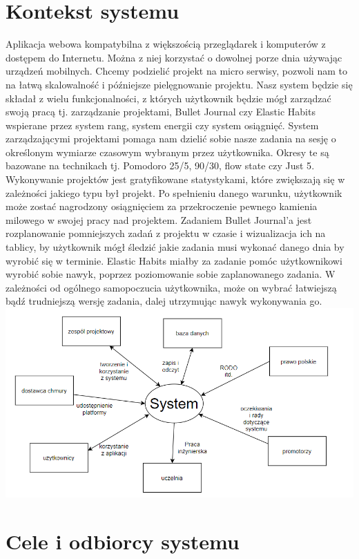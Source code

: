 \documentclass[a4paper,11pt]{report}
\begin{document}
\section {Kontekst systemu}
Aplikacja webowa kompatybilna z większością przeglądarek i komputerów z dostępem do Internetu. Można z niej korzystać o dowolnej porze dnia używając urządzeń mobilnych. Chcemy podzielić projekt na micro serwisy, pozwoli nam to na łatwą skalowalność i późniejsze pielęgnowanie projektu. Nasz system będzie się składał z wielu funkcjonalności, z których użytkownik będzie mógł zarządzać swoją pracą tj. zarządzanie projektami, Bullet Journal czy Elastic Habits\cite{elastic} wspierane przez system rang, system energii czy system osiągnięć. System zarządzającymi projektami pomaga nam dzielić sobie nasze zadania na sesję o określonym wymiarze czasowym wybranym przez użytkownika. Okresy te są bazowane na technikach tj. Pomodoro 25/5\cite{Pomodoro}, 90/30\cite{90/30}, flow state\cite{flow} czy Just 5\cite{just5}. Wykonywanie projektów jest gratyfikowane statystykami, które zwiększają się w zależności jakiego typu był projekt. Po spełnieniu danego warunku, użytkownik może zostać nagrodzony osiągnięciem za przekroczenie pewnego kamienia milowego w swojej pracy nad projektem. Zadaniem Bullet Journal’a jest rozplanowanie pomniejszych zadań z projektu w czasie i wizualizacja ich na tablicy, by użytkownik mógł śledzić jakie zadania musi wykonać danego dnia by wyrobić się w terminie. Elastic Habits miałby za zadanie pomóc użytkownikowi wyrobić sobie nawyk, poprzez poziomowanie sobie zaplanowanego zadania. W zależności od ogólnego samopoczucia użytkownika, może on wybrać łatwiejszą bądź trudniejszą wersję zadania, dalej utrzymując nawyk wykonywania go. \\
\includegraphics[width=15 cm, left]{system.png}
\section {Cele i odbiorcy systemu}
\end{document}
